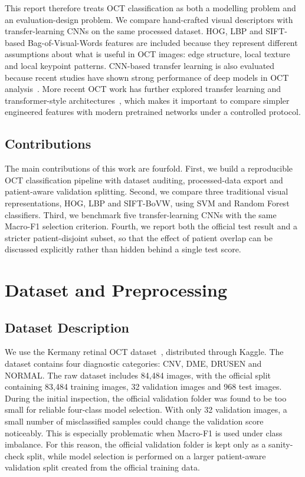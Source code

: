 \documentclass[10pt,twocolumn,letterpaper]{article}
\begin{document}
This report therefore treats OCT classification as both a modelling problem and an evaluation-design problem. We compare hand-crafted visual descriptors with transfer-learning CNNs on the same processed dataset. HOG, LBP and SIFT-based Bag-of-Visual-Words features are included because they represent different assumptions about what is useful in OCT images: edge structure, local texture and local keypoint patterns. CNN-based transfer learning is also evaluated because recent studies have shown strong performance of deep models in OCT analysis~\cite{kermany2018,sunija2021,muchuchuti2023,koseoglu2023}. More recent OCT work has further explored transfer learning and transformer-style architectures~\cite{akca2024,jaimes2025}, which makes it important to compare simpler engineered features with modern pretrained networks under a controlled protocol.

\subsection{Contributions}
The main contributions of this work are fourfold. First, we build a reproducible OCT classification pipeline with dataset auditing, processed-data export and patient-aware validation splitting. Second, we compare three traditional visual representations, HOG, LBP and SIFT-BoVW, using SVM and Random Forest classifiers. Third, we benchmark five transfer-learning CNNs with the same Macro-F1 selection criterion. Fourth, we report both the official test result and a stricter patient-disjoint subset, so that the effect of patient overlap can be discussed explicitly rather than hidden behind a single test score.

\section{Dataset and Preprocessing}
\subsection{Dataset Description}
We use the Kermany retinal OCT dataset~\cite{kermany2018}, distributed through Kaggle. The dataset contains four diagnostic categories: CNV, DME, DRUSEN and NORMAL. The raw dataset includes 84,484 images, with the official split containing 83,484 training images, 32 validation images and 968 test images. During the initial inspection, the official validation folder was found to be too small for reliable four-class model selection. With only 32 validation images, a small number of misclassified samples could change the validation score noticeably. This is especially problematic when Macro-F1 is used under class imbalance. For this reason, the official validation folder is kept only as a sanity-check split, while model selection is performed on a larger patient-aware validation split created from the official training data.
\end{document}
